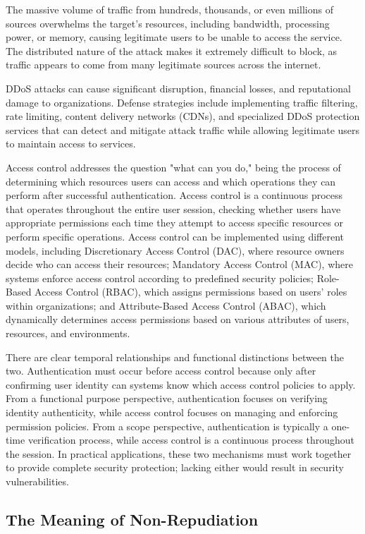 \documentclass[12pt,a4paper]{article}
\begin{document}
The massive volume of traffic from hundreds, thousands, or even millions of sources overwhelms the target's resources, including bandwidth, processing power, or memory, causing legitimate users to be unable to access the service. The distributed nature of the attack makes it extremely difficult to block, as traffic appears to come from many legitimate sources across the internet.

DDoS attacks can cause significant disruption, financial losses, and reputational damage to organizations. Defense strategies include implementing traffic filtering, rate limiting, content delivery networks (CDNs), and specialized DDoS protection services that can detect and mitigate attack traffic while allowing legitimate users to maintain access to services.

Access control addresses the question "what can you do," being the process of determining which resources users can access and which operations they can perform after successful authentication. Access control is a continuous process that operates throughout the entire user session, checking whether users have appropriate permissions each time they attempt to access specific resources or perform specific operations. Access control can be implemented using different models, including Discretionary Access Control (DAC), where resource owners decide who can access their resources; Mandatory Access Control (MAC), where systems enforce access control according to predefined security policies; Role-Based Access Control (RBAC), which assigns permissions based on users' roles within organizations; and Attribute-Based Access Control (ABAC), which dynamically determines access permissions based on various attributes of users, resources, and environments.

There are clear temporal relationships and functional distinctions between the two. Authentication must occur before access control because only after confirming user identity can systems know which access control policies to apply. From a functional purpose perspective, authentication focuses on verifying identity authenticity, while access control focuses on managing and enforcing permission policies. From a scope perspective, authentication is typically a one-time verification process, while access control is a continuous process throughout the session. In practical applications, these two mechanisms must work together to provide complete security protection; lacking either would result in security vulnerabilities.

\subsection{The Meaning of Non-Repudiation}
\end{document}
